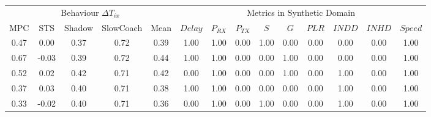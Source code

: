 \begin{tabular}{|*{5}{c|}|*{9}{c|}}
\toprule
\multicolumn{5}{|c||}{Behaviour $\Delta T_{ix}$} & \multicolumn{9}{c|}{Metrics in Synthetic Domain}\\
               MPC &   STS & Shadow & SlowCoach & Mean &                     $Delay$ & $P_{RX}$ & $P_{TX}$ &  $S$ &  $G$ & $PLR$ & $INDD$ & $INHD$ & $Speed$ \\
\midrule
              0.47 &  0.00 &   0.37 &      0.72 & 0.39 &                        1.00 &     1.00 &     0.00 & 1.00 & 0.00 &  0.00 &   0.00 &   0.00 &    1.00 \\
              0.67 & -0.03 &   0.39 &      0.72 & 0.44 &                        1.00 &     1.00 &     0.00 & 0.00 & 1.00 &  0.00 &   0.00 &   0.00 &    1.00 \\
              0.52 &  0.02 &   0.42 &      0.71 & 0.42 &                        0.00 &     1.00 &     0.00 & 0.00 & 1.00 &  0.00 &   1.00 &   0.00 &    1.00 \\
              0.37 &  0.03 &   0.40 &      0.71 & 0.38 &                        1.00 &     1.00 &     0.00 & 0.00 & 0.00 &  0.00 &   1.00 &   0.00 &    1.00 \\
              0.33 & -0.02 &   0.40 &      0.71 & 0.36 &                        0.00 &     1.00 &     0.00 & 1.00 & 0.00 &  0.00 &   1.00 &   0.00 &    1.00 \\
\bottomrule
\end{tabular}
